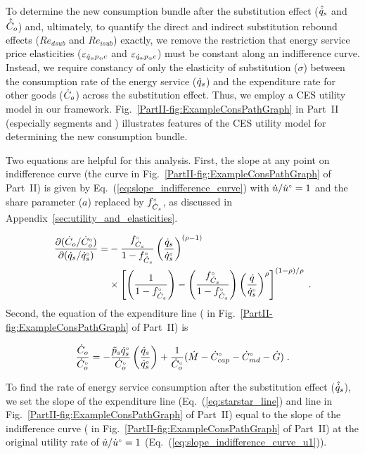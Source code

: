 To determine the new consumption bundle after the substitution effect 
($\hat{\dot{q}}_s$ and $\hat{\dot{C}}_o$)
and,
ultimately, to quantify the direct and indirect substitution rebound effects
($Re_{dsub}$ and $Re_{isub}$) exactly,
we remove the restriction that energy service price elasticities ($\varepsilon_{\dot{q}_s\!,p_s\!,c}$ and $\varepsilon_{\dot{q}_o\!,p_s\!,c}$)
must be constant along an indifference curve.
Instead, we require constancy of only
the elasticity of substitution ($\sigma$) between
the consumption rate of the energy service ($\dot{q}_s$)
and the expenditure rate for other goods ($\dot{C}_o$)
across the substitution effect.
Thus, we employ a CES utility model in our framework.
Fig.~\ref{PartII-fig:ExampleConsPathGraph} in Part~II
(especially segments \starc{} and \chat{})
illustrates features
of the CES utility model for determining the new consumption bundle.

Two equations are helpful for this analysis.
First, the slope at any point on indifference curve 
(the \iicirc{} curve in 
Fig.~\ref{PartII-fig:ExampleConsPathGraph} of Part~II)
is given by Eq.~(\ref{eq:slope_indifference_curve}) with 
$\dot{u}/{}{\dot{u}}^{\scriptscriptstyle \circ} = 1$ and 
the share parameter ($a$) replaced by ${}{f}^{\scriptscriptstyle \circ}_{\dot{C}_s}$,
as discussed in Appendix~\ref{sec:utility_and_elasticities}.

\begin{align} \label{eq:slope_indifference_curve_u1}
  \frac{\partial (\dot{C}_o/{}{\dot{C}}^{\scriptscriptstyle \circ}_o)}{\partial (\dot{q}_s/{}{\dot{q}}^{\scriptscriptstyle \circ}_s)} =&
        -\frac{{}{f}^{\scriptscriptstyle \circ}_{\dot{C}_s}}{1 - {}{f}^{\scriptscriptstyle \circ}_{\dot{C}_s}} \left( \frac{\dot{q}_s}{{}{\dot{q}}^{\scriptscriptstyle \circ}_s} \right)^{(\rho -1)} \nonumber  \\
        &\times \left[ \left( \frac{1}{1 - {}{f}^{\scriptscriptstyle \circ}_{\dot{C}_s}} \right) 
                - \left( \frac{{}{f}^{\scriptscriptstyle \circ}_{\dot{C}_s}}{1 - {}{f}^{\scriptscriptstyle \circ}_{\dot{C}_s}} \right) 
                          \left( \frac{\dot{q}}{{}{\dot{q}}^{\scriptscriptstyle \circ}_s} \right)^\rho \right]^{(1 - \rho)/\rho} \; .
\end{align}
%
Second, the equation of the expenditure line 
(\starstar{} in Fig.~\ref{PartII-fig:ExampleConsPathGraph} 
of Part~II) is

\begin{equation} \label{eq:starstar_line}
  \frac{\dot{C}_o}{{}{\dot{C}}^{\scriptscriptstyle \circ}_o} = 
      -\frac{\tilde{p}_s {}{\dot{q}}^{\scriptscriptstyle \circ}_s}
            {{}{\dot{C}}^{\scriptscriptstyle \circ}_o}
        \left(  \frac{\dot{q}_s}{{}{\dot{q}}^{\scriptscriptstyle \circ}_s} \right)
      + \frac{1}{{}{\dot{C}}^{\scriptscriptstyle \circ}_o} 
        (\dot{M} - {}{\dot{C}}^{\scriptscriptstyle \circ}_{cap} - {}{\dot{C}}^{\scriptscriptstyle \circ}_{md} - \dot{G}) \; .
\end{equation}

To find the rate of energy service consumption after the substitution effect
($\hat{\dot{q}}_s$), we set the slope of the 
expenditure line (Eq.~(\ref{eq:starstar_line})
and line \starstar{} in Fig.~\ref{PartII-fig:ExampleConsPathGraph} of Part~II)
equal to the slope of the 
indifference curve 
(\iicirc{} in Fig.~\ref{PartII-fig:ExampleConsPathGraph} of Part~II)
at the original utility rate of $\dot{u}/{}{\dot{u}}^{\scriptscriptstyle \circ} = 1$ (Eq.~(\ref{eq:slope_indifference_curve_u1})).

